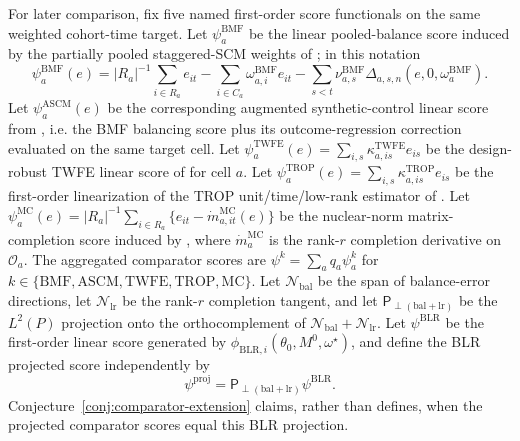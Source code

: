 \documentclass[11pt]{article}
\theoremstyle{definition}
\theoremstyle{plain}
\theoremstyle{remark}
\begin{document}
For later comparison, fix five named first-order score functionals on the same
weighted cohort-time target. Let $\psi^{\mathrm{BMF}}_a$ be the linear
pooled-balance score induced by the partially pooled staggered-SCM weights of
\citet{BenMichaelFellerRothstein2022}; in this notation
\[
  \psi^{\mathrm{BMF}}_a(e)=
  |R_a|^{-1}\sum_{i\in R_a}e_{it}
  -\sum_{i\in C_a}\omega^{\mathrm{BMF}}_{a,i}e_{it}
  -\sum_{s<t}\nu^{\mathrm{BMF}}_{a,s}\Delta_{a,s,n}(e,0,\omega^{\mathrm{BMF}}_a).
\]
Let $\psi^{\mathrm{ASCM}}_a(e)$ be the corresponding augmented synthetic-control
linear score from \citet{BenMichaelFellerRothstein2021}, i.e. the BMF balancing
score plus its outcome-regression correction evaluated on the same target cell.
Let $\psi^{\mathrm{TWFE}}_a(e)=\sum_{i,s}\kappa^{\mathrm{TWFE}}_{a,is}e_{is}$
be the design-robust TWFE linear score of
\citet{ArkhangelskyImbensLeiLuo2024} for cell $a$. Let
$\psi^{\mathrm{TROP}}_a(e)=\sum_{i,s}\kappa^{\mathrm{TROP}}_{a,is}e_{is}$
be the first-order linearization of the TROP unit/time/low-rank estimator of
\citet{AtheyImbensQuViviano2025}. Let
$\psi^{\mathrm{MC}}_a(e)=|R_a|^{-1}\sum_{i\in R_a}\{e_{it}-\dot m^{\mathrm{MC}}_{a,it}(e)\}$
be the nuclear-norm matrix-completion score induced by
\citet{AtheyBayatiDoudchenkoImbensKhosravi2021}, where
$\dot m^{\mathrm{MC}}_{a}$ is the rank-$r$ completion derivative on
$\mathcal O_a$. The aggregated comparator scores are
$\psi^k=\sum_a q_a\psi^k_a$ for
$k\in\{\mathrm{BMF},\mathrm{ASCM},\mathrm{TWFE},\mathrm{TROP},\mathrm{MC}\}$.
Let $\mathcal N_{\mathrm{bal}}$ be the span of balance-error directions,
let $\mathcal N_{\mathrm{lr}}$ be the rank-$r$ completion tangent, and let
$\mathsf P_{\perp(\mathrm{bal}+\mathrm{lr})}$ be the $L^2(P)$ projection onto
the orthocomplement of
$\mathcal N_{\mathrm{bal}}+\mathcal N_{\mathrm{lr}}$. Let
$\psi^{\mathrm{BLR}}$ be the first-order linear score generated by
$\phi_{\mathrm{BLR},i}(\theta_0,M^0,\omega^\star)$, and define the BLR
projected score independently by
\[
  \psi^{\mathrm{proj}}
  =\mathsf P_{\perp(\mathrm{bal}+\mathrm{lr})}\psi^{\mathrm{BLR}}.
\]
Conjecture~\ref{conj:comparator-extension} claims, rather than defines, when
the projected comparator scores equal this BLR projection.
\end{document}
